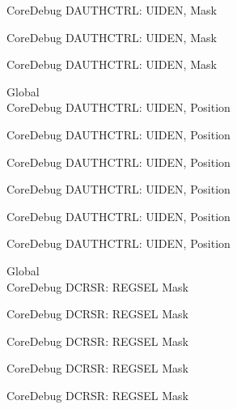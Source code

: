 \begin{DoxyRefList}
\label{deprecated__deprecated000758}%
%
Core\+Debug DAUTHCTRL\+: UIDEN, Mask 

\label{deprecated__deprecated001209}%
%
Core\+Debug DAUTHCTRL\+: UIDEN, Mask 

\label{deprecated__deprecated001311}%
%
Core\+Debug DAUTHCTRL\+: UIDEN, Mask  
\item[Global \doxylink{group___c_m_s_i_s___s_c_b_gab9cb997565a842f5eb9365bd58d7cda2}{Core\+Debug\+\_\+\+DAUTHCTRL\+\_\+\+UIDEN\+\_\+\+Pos} ]\hfill \\
\label{deprecated__deprecated000079}%
%
Core\+Debug DAUTHCTRL\+: UIDEN, Position 

\label{deprecated__deprecated000530}%
%
Core\+Debug DAUTHCTRL\+: UIDEN, Position 

\label{deprecated__deprecated000632}%
%
Core\+Debug DAUTHCTRL\+: UIDEN, Position 

\label{deprecated__deprecated000757}%
%
Core\+Debug DAUTHCTRL\+: UIDEN, Position 

\label{deprecated__deprecated001208}%
%
Core\+Debug DAUTHCTRL\+: UIDEN, Position 

\label{deprecated__deprecated001310}%
%
Core\+Debug DAUTHCTRL\+: UIDEN, Position  
\item[Global \doxylink{group___c_m_s_i_s___core_debug_ga17cafbd72b55030219ce5609baa7c01d}{Core\+Debug\+\_\+\+DCRSR\+\_\+\+REGSEL\+\_\+\+Msk} ]\hfill \\
\label{deprecated__deprecated000044}%
%
Core\+Debug DCRSR\+: REGSEL Mask 

\label{deprecated__deprecated000132}%
%
Core\+Debug DCRSR\+: REGSEL Mask 

\label{deprecated__deprecated000188}%
%
Core\+Debug DCRSR\+: REGSEL Mask 

\label{deprecated__deprecated000271}%
%
Core\+Debug DCRSR\+: REGSEL Mask 

\label{deprecated__deprecated000330}%
%
Core\+Debug DCRSR\+: REGSEL Mask 


\end{DoxyRefList}
